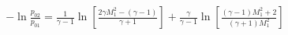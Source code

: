 \documentclass[10pt]{article}
\begin{document}
\begin{align*}- \ln \frac{p_{02}}{p_{01}}
=
\frac{1}{\gamma-1} 
\ln 
\left[ 
\frac{2 \gamma M_{1}^{2} - \left( \gamma -1 \right) }{\gamma + 1}
\right]
+
\frac{\gamma}{\gamma-1}
\ln 
\left[ 
\frac{ \left( \gamma -1 \right) M_{1}^{2} + 2 }{ \left( \gamma + 1 \right) M_{1}^{2} }
\right]\end{align*}
\end{document}

